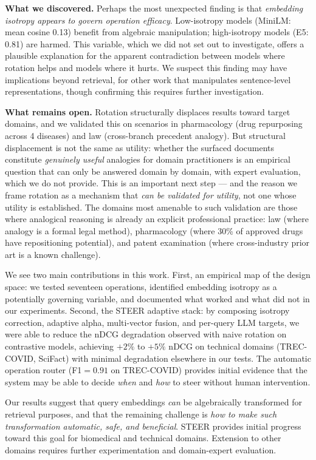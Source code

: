 \documentclass{article}
\begin{document}
\textbf{What we discovered.} Perhaps the most unexpected finding is that \emph{embedding isotropy appears to govern operation efficacy}. Low-isotropy models (MiniLM: mean cosine 0.13) benefit from algebraic manipulation; high-isotropy models (E5: 0.81) are harmed. This variable, which we did not set out to investigate, offers a plausible explanation for the apparent contradiction between models where rotation helps and models where it hurts. We suspect this finding may have implications beyond retrieval, for other work that manipulates sentence-level representations, though confirming this requires further investigation.

\textbf{What remains open.} Rotation structurally displaces results toward target domains, and we validated this on scenarios in pharmacology (drug repurposing across 4 diseases) and law (cross-branch precedent analogy). But structural displacement is not the same as utility: whether the surfaced documents constitute \emph{genuinely useful} analogies for domain practitioners is an empirical question that can only be answered domain by domain, with expert evaluation, which we do not provide. This is an important next step --- and the reason we frame rotation as a mechanism that \emph{can be validated for utility}, not one whose utility is established. The domains most amenable to such validation are those where analogical reasoning is already an explicit professional practice: law (where analogy is a formal legal method), pharmacology (where 30\% of approved drugs have repositioning potential), and patent examination (where cross-industry prior art is a known challenge).

We see two main contributions in this work. First, an empirical map of the design space: we tested seventeen operations, identified embedding isotropy as a potentially governing variable, and documented what worked and what did not in our experiments. Second, the STEER adaptive stack: by composing isotropy correction, adaptive alpha, multi-vector fusion, and per-query LLM targets, we were able to reduce the nDCG degradation observed with naive rotation on contrastive models, achieving $+2\%$ to $+5\%$ nDCG on technical domains (TREC-COVID, SciFact) with minimal degradation elsewhere in our tests. The automatic operation router (F1$=0.91$ on TREC-COVID) provides initial evidence that the system may be able to decide \emph{when} and \emph{how} to steer without human intervention.

Our results suggest that query embeddings \emph{can} be algebraically transformed for retrieval purposes, and that the remaining challenge is \emph{how to make such transformation automatic, safe, and beneficial}. STEER provides initial progress toward this goal for biomedical and technical domains. Extension to other domains requires further experimentation and domain-expert evaluation.
\end{document}
